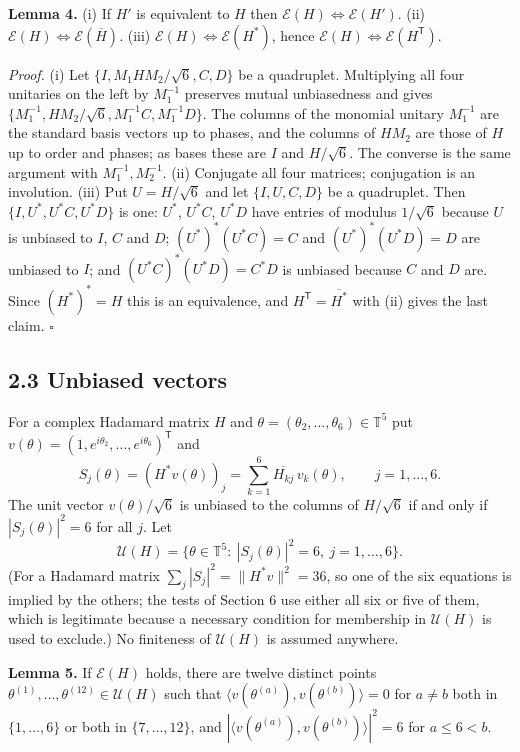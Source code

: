 \documentclass[
  11pt,
]{article}
\begin{document}
\textbf{Lemma 4.} (i) If \(H'\) is equivalent to \(H\) then
\(\mathcal E(H)\iff\mathcal E(H')\). (ii)
\(\mathcal E(H)\iff\mathcal E(\overline H)\). (iii)
\(\mathcal E(H)\iff\mathcal E(H^*)\), hence
\(\mathcal E(H)\iff\mathcal E(H^{\mathsf T})\).

\emph{Proof.} (i) Let \(\{I,M_1HM_2/\sqrt6,C,D\}\) be a quadruplet.
Multiplying all four unitaries on the left by \(M_1^{-1}\) preserves
mutual unbiasedness and gives
\(\{M_1^{-1},HM_2/\sqrt6,M_1^{-1}C,M_1^{-1}D\}\). The columns of the
monomial unitary \(M_1^{-1}\) are the standard basis vectors up to
phases, and the columns of \(HM_2\) are those of \(H\) up to order and
phases; as bases these are \(I\) and \(H/\sqrt6\). The converse is the
same argument with \(M_1^{-1},M_2^{-1}\). (ii) Conjugate all four
matrices; conjugation is an involution. (iii) Put \(U=H/\sqrt6\) and let
\(\{I,U,C,D\}\) be a quadruplet. Then \(\{I,U^*,U^*C,U^*D\}\) is one:
\(U^*\), \(U^*C\), \(U^*D\) have entries of modulus \(1/\sqrt6\) because
\(U\) is unbiased to \(I\), \(C\) and \(D\); \((U^*)^*(U^*C)=C\) and
\((U^*)^*(U^*D)=D\) are unbiased to \(I\); and \((U^*C)^*(U^*D)=C^*D\)
is unbiased because \(C\) and \(D\) are. Since \((H^*)^*=H\) this is an
equivalence, and \(H^{\mathsf T}=\overline{H^*}\) with (ii) gives the
last claim. \(\square\)

\subsection{2.3 Unbiased vectors}\label{unbiased-vectors}

For a complex Hadamard matrix \(H\) and
\(\theta=(\theta_2,\dots,\theta_6)\in\mathbb T^5\) put
\(v(\theta)=(1,e^{i\theta_2},\dots,e^{i\theta_6})^{\mathsf T}\) and \[
S_j(\theta)=(H^*v(\theta))_j=\sum_{k=1}^6\overline{H_{kj}}\,v_k(\theta),\qquad j=1,\dots,6 .
\] The unit vector \(v(\theta)/\sqrt6\) is unbiased to the columns of
\(H/\sqrt6\) if and only if \(|S_j(\theta)|^2=6\) for all \(j\). Let \[
\mathcal U(H)=\{\theta\in\mathbb T^5:\ |S_j(\theta)|^2=6,\ j=1,\dots,6\}.
\] (For a Hadamard matrix \(\sum_j|S_j|^2=\|H^*v\|^2=36\), so one of the
six equations is implied by the others; the tests of Section 6 use
either all six or five of them, which is legitimate because a necessary
condition for membership in \(\mathcal U(H)\) is used to exclude.) No
finiteness of \(\mathcal U(H)\) is assumed anywhere.

\textbf{Lemma 5.} If \(\mathcal E(H)\) holds, there are twelve distinct
points \(\theta^{(1)},\dots,\theta^{(12)}\in\mathcal U(H)\) such that
\(\langle v(\theta^{(a)}),v(\theta^{(b)})\rangle=0\) for \(a\ne b\) both
in \(\{1,\dots,6\}\) or both in \(\{7,\dots,12\}\), and
\(|\langle v(\theta^{(a)}),v(\theta^{(b)})\rangle|^2=6\) for
\(a\le6<b\).
\end{document}
